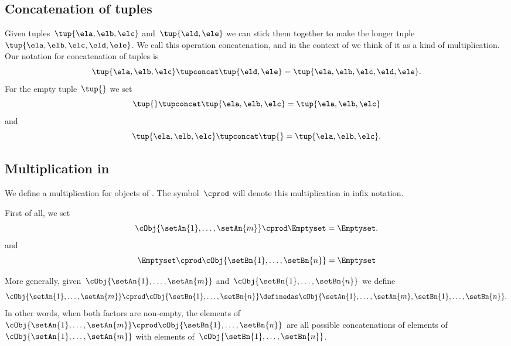 \subsection{Concatenation of tuples}

Given tuples~$\tup{\ela, \elb, \elc}$ and~$\tup{\eld, \ele}$ we can stick them together to make the longer tuple~$\tup{\ela, \elb, \elc, \eld, \ele}$.
We call this operation concatenation, and in the context of \cCat{\Set} we think of it as a kind of multiplication.
Our notation for concatenation of tuples is
\begin{equation*}
    \tup{\ela, \elb, \elc} \tupconcat \tup{\eld, \ele} = \tup{\ela, \elb, \elc, \eld, \ele}.
\end{equation*}
For the empty tuple~$\tup{  }$ we set
\begin{equation*}
    \tup{} \tupconcat \tup{\ela, \elb, \elc}  = \tup{\ela, \elb, \elc}
\end{equation*}
and
\begin{equation*}
    \tup{\ela, \elb, \elc}  \tupconcat \tup{ } = \tup{\ela, \elb, \elc}.
\end{equation*}

\subsection{Multiplication in \cCat{\Set}}

We define a multiplication for objects of \cCat{\Set}.
The symbol~$\cprod$ will denote this multiplication in infix notation.

First of all, we set
\begin{equation*}
    \cObj{\setAn{1}, \ldots, \setAn{m}} \cprod \Emptyset = \Emptyset.
\end{equation*}
and
\begin{equation*}
    \Emptyset \cprod \cObj{\setBn{1}, \ldots, \setBn{n}} = \Emptyset
\end{equation*}

More generally, given~$\cObj{\setAn{1}, \ldots, \setAn{m}}$ and~$\cObj{\setBn{1},  \ldots, \setBn{n}}$ we define
\begin{equation}
    \label{eq:strict-monoidal-product-sets}
    \cObj{\setAn{1}, \ldots, \setAn{m}} \cprod \cObj{\setBn{1}, \ldots, \setBn{n}} \definedas \cObj{\setAn{1}, \ldots, \setAn{m}, \setBn{1},  \ldots, \setBn{n}}.
\end{equation}
In other words, when both factors are non-empty, the elements of~$\cObj{\setAn{1}, \ldots, \setAn{m}} \cprod \cObj{\setBn{1}, \ldots, \setBn{n}}$ are all possible concatenations of elements of~$\cObj{\setAn{1}, \ldots, \setAn{m}}$ with elements of~$\cObj{\setBn{1}, \ldots, \setBn{n}}$.

